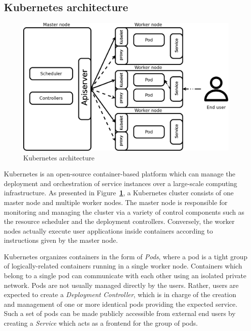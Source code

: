 \documentclass[letterpaper,twocolumn,10pt]{article}
\let\origref\ref
\def\ref#1{\textbf{\origref{#1}}}
\begin{document}
\subsection{Kubernetes architecture}

\begin{figure}[t]
  \centering
  \includegraphics[width=\linewidth]{images/arch.png}
  \caption{Kubernetes architecture} 
  \label{fig:arch}
\end{figure}

Kubernetes is an open-source container-based platform which can manage
the deployment and orchestration of service instances over a
large-scale computing infrastructure. As presented in
Figure~\ref{fig:arch}, a Kubernetes cluster consists of one master node
and multiple worker nodes. The master node is responsible for
monitoring and managing the cluster via a variety of control
components such as the resource scheduler and the deployment
controllers. Conversely, the worker nodes actually execute user
applications inside containers according to instructions given by the
master node.

Kubernetes organizes containers in the form of \emph{Pods}, where a
pod is a tight group of logically-related containers running in a
single worker node. Containers which belong to a single pod can
communicate with each other using an isolated private network. Pods
are not usually managed directly by the users. Rather, users are
expected to create a \emph{Deployment Controller}, which is in charge
of the creation and management of one or more identical pods providing
the expected service. Such a set of pods can be made publicly
accessible from external end users by creating a \emph{Service} which
acts as a frontend for the group of pods.
\end{document}

